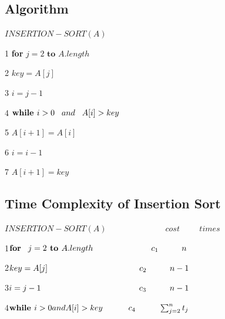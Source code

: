 \documentclass[9 pt]{report}
\begin{document}
\subsection{\huge Algorithm}

$INSERTION-SORT(A)$

1   \textbf{for}  $j=2   \textbf{   to  }   A.length$

2    \hspace{1cm}$ key=A[j] $

3     \hspace{1cm}$i=j-1$

4     \hspace{1cm}$\textbf{while  }i>0\hspace{0.3cm}and \hspace{0.3cm} A[i]>key$

5     \hspace{1.5cm}$A[i+1]=A[i]$

6     \hspace{1.5cm}$i=i-1$

7     \hspace{1cm}$A[i+1]=key$


\subsection{ \huge Time Complexity  of  Insertion  Sort}

$INSERTION-SORT(A)  \hspace{3cm}cost \hspace{1cm}times$
\vspace{0.4cm}

1\hspace{0.75cm}$\textbf{for}\hspace{0.3cm}j=2 \textbf{ to } A.length\hspace{2.5cm}c_1\hspace{1cm} n  $

2\hspace{1.5cm}$key=A[j]\hspace{3.94cm}c_2\hspace{1cm}n-1$

3\hspace{1.5cm}$i=j-1\hspace{4.2cm}c_3\hspace{1cm}n-1$

4\hspace{1.5cm}$\textbf{while }i>0 and A[i]>key\hspace{1.1cm}c_4\hspace{1cm}\sum_{j=2}^nt_j$
\end{document}
